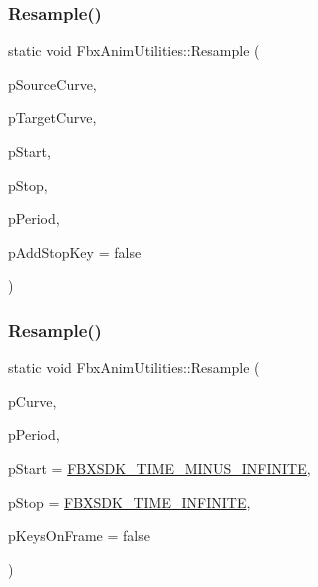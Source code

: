 \subsubsection{\texorpdfstring{Resample()}{Resample()}\hspace{0.1cm}{\footnotesize\ttfamily [2/3]}}
{\footnotesize\ttfamily static void Fbx\+Anim\+Utilities\+::\+Resample (\begin{DoxyParamCaption}\item[{\hyperlink{class_fbx_anim_curve}{Fbx\+Anim\+Curve} \&}]{p\+Source\+Curve,  }\item[{\hyperlink{class_fbx_anim_curve}{Fbx\+Anim\+Curve} \&}]{p\+Target\+Curve,  }\item[{\hyperlink{class_fbx_time}{Fbx\+Time} \&}]{p\+Start,  }\item[{\hyperlink{class_fbx_time}{Fbx\+Time} \&}]{p\+Stop,  }\item[{\hyperlink{class_fbx_time}{Fbx\+Time} \&}]{p\+Period,  }\item[{bool}]{p\+Add\+Stop\+Key = {\ttfamily false} }\end{DoxyParamCaption})\hspace{0.3cm}{\ttfamily [static]}}

\mbox{\label{class_fbx_anim_utilities_a3fde586a335a5296a9c5a215993b8a52}} 
\subsubsection{\texorpdfstring{Resample()}{Resample()}\hspace{0.1cm}{\footnotesize\ttfamily [3/3]}}
{\footnotesize\ttfamily static void Fbx\+Anim\+Utilities\+::\+Resample (\begin{DoxyParamCaption}\item[{\hyperlink{class_fbx_anim_curve}{Fbx\+Anim\+Curve} \&}]{p\+Curve,  }\item[{\hyperlink{class_fbx_time}{Fbx\+Time}}]{p\+Period,  }\item[{\hyperlink{class_fbx_time}{Fbx\+Time}}]{p\+Start = {\ttfamily \hyperlink{fbxtime_8h_ad274ec1f909723127ab573a52f8be216}{F\+B\+X\+S\+D\+K\+\_\+\+T\+I\+M\+E\+\_\+\+M\+I\+N\+U\+S\+\_\+\+I\+N\+F\+I\+N\+I\+TE}},  }\item[{\hyperlink{class_fbx_time}{Fbx\+Time}}]{p\+Stop = {\ttfamily \hyperlink{fbxtime_8h_a1e6db3fe0f84f0b7daa775739f93526f}{F\+B\+X\+S\+D\+K\+\_\+\+T\+I\+M\+E\+\_\+\+I\+N\+F\+I\+N\+I\+TE}},  }\item[{bool}]{p\+Keys\+On\+Frame = {\ttfamily false} }\end{DoxyParamCaption})\hspace{0.3cm}{\ttfamily [static]}}

